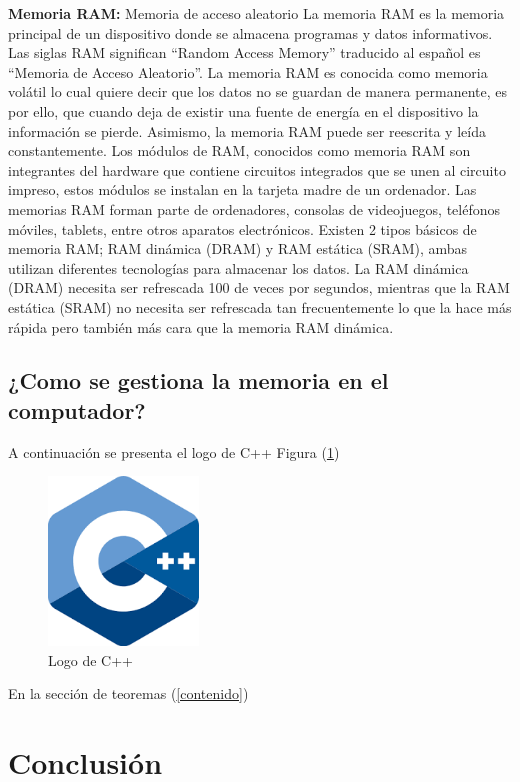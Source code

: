 \documentclass{article}
\begin{document}
\textbf{Memoria RAM:}
Memoria de acceso aleatorio
\newline
\newline
La memoria RAM es la memoria principal de un dispositivo donde se almacena programas y datos informativos. Las siglas RAM significan “Random Access Memory” traducido al español es “Memoria de Acceso Aleatorio”.
\newline
\newline
La memoria RAM es conocida como memoria volátil lo cual quiere decir que los datos no se guardan de manera permanente, es por ello, que cuando deja de existir una fuente de energía en el dispositivo la información se pierde. Asimismo, la memoria RAM puede ser reescrita y leída constantemente.
\newline
\newline
Los módulos de RAM, conocidos como memoria RAM son integrantes del hardware que contiene circuitos integrados que se unen al circuito impreso, estos módulos se instalan en la tarjeta madre de un ordenador. Las memorias RAM forman parte de ordenadores, consolas de videojuegos, teléfonos móviles, tablets, entre otros aparatos electrónicos.
\newline
\newline
Existen 2 tipos básicos de memoria RAM; RAM dinámica (DRAM) y RAM estática (SRAM), ambas utilizan diferentes tecnologías para almacenar los datos. La RAM dinámica (DRAM) necesita ser refrescada 100 de veces por segundos, mientras que la RAM estática (SRAM) no necesita ser refrescada tan frecuentemente lo que la hace más rápida pero también más cara que la memoria RAM dinámica.

\subsection{¿Como se gestiona la memoria en el computador?}

A continuación se presenta el logo de C++ Figura (\ref{fig:cpplogo})

\begin{figure}[h]
\includegraphics[width=4cm]{cpplogo.png}
\centering
\caption{Logo de C++}
\label{fig:cpplogo}
\end{figure}

En la sección de teoremas (\ref{contenido})

\section{Conclusión} \label{conclulsion}



\end{document}
